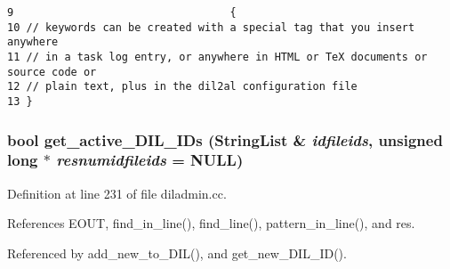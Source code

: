\footnotesize\begin{verbatim}9                                  {
10 // keywords can be created with a special tag that you insert anywhere
11 // in a task log entry, or anywhere in HTML or TeX documents or source code or
12 // plain text, plus in the dil2al configuration file
13 }
\end{verbatim}\normalsize 
{}
\subsubsection{\setlength{\rightskip}{0pt plus 5cm}bool get\_\-active\_\-DIL\_\-IDs ({\bf String\-List} \& {\em idfileids}, unsigned long $\ast$ {\em resnumidfileids} = NULL)}\label{dil2al_8hh_a297}




Definition at line 231 of file diladmin.cc.

References EOUT, find\_\-in\_\-line(), find\_\-line(), pattern\_\-in\_\-line(), and res.

Referenced by add\_\-new\_\-to\_\-DIL(), and get\_\-new\_\-DIL\_\-ID().



